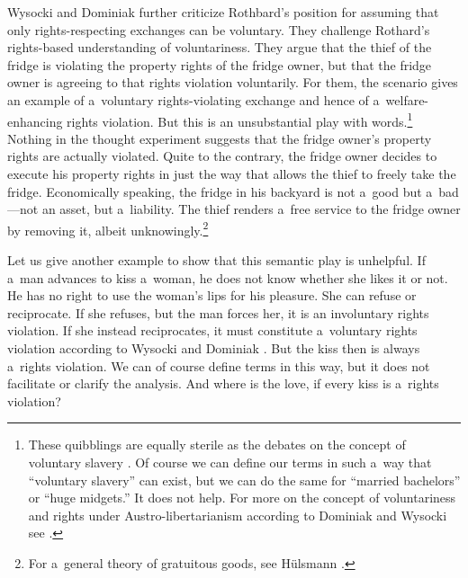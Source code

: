 Wysocki and Dominiak 
\parencite*[][pp.63–64]{wysocki_how_2023} %
 further criticize Rothbard's position for assuming that only rights-respecting exchanges can be voluntary. They challenge Rothard's rights-based understanding of voluntariness. They argue that the thief of the fridge is violating the property rights of the fridge owner, but that the fridge owner is agreeing to that rights violation voluntarily. For them, the scenario gives an example of a~voluntary rights-violating exchange and hence of a~welfare-enhancing rights violation. But this is an unsubstantial play with words.\footnote{These quibblings are equally sterile as the debates on the concept of voluntary slavery 
\parencites[][]{block_toward_2003}[][]{casey_can_2011}[][]{dominiak_problem_2017}. %
 Of course we can define our terms in such a~way that ``voluntary slavery'' can exist, but we can do the same for ``married bachelors'' or ``huge midgets.'' It does not help. For more on the concept of voluntariness and rights under Austro-libertarianism according to Dominiak and Wysocki see 
\parencites[][]{dominiak_libertarianism_2018}[][]{dominiak_contract_2022}[][]{dominiak_proceeds_2023}[][]{dominiak_contract_2022}[][]{megger_coercion_2023}[][]{wysocki_problems_2020}[][]{wysocki_austro-libertarian_2021}[][]{wysocki_austrian_2019}[][]{wysocki_austrian_2019}[][]{wysocki_problems_2020}.%
} Nothing in the thought experiment suggests that the fridge owner's property rights are actually violated. Quite to the contrary, the fridge owner decides to execute his property rights in just the way that allows the thief to freely take the fridge. Economically speaking, the fridge in his backyard is not a~good but a~bad---not an asset, but a~liability. The thief renders a~free service to the fridge owner by removing it, albeit unknowingly.\footnote{For a~general theory of gratuitous goods, see Hülsmann 
\parencite*[][]{hulsmann_wirtschaft_2023}.%
}



Let us give another example to show that this semantic play is unhelpful. If a~man advances to kiss a~woman, he does not know whether she likes it or not. He has no right to use the woman's lips for his pleasure. She can refuse or reciprocate. If she refuses, but the man forces her, it is an involuntary rights violation. If she instead reciprocates, it must constitute a~voluntary rights violation according to Wysocki and Dominiak 
\parencite*[][]{wysocki_how_2023}. %
 But the kiss then is always a~rights violation. We can of course define terms in this way, but it does not facilitate or clarify the analysis. And where is the love, if every kiss is a~rights violation?



